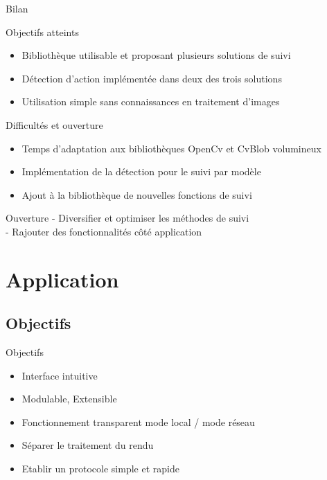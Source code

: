\documentclass{beamer}
\begin{document}
            \begin{frame}{Bilan}
                  \begin{exampleblock}{Objectifs atteints}
                        \begin{itemize}
                        \item Bibliothèque utilisable et proposant plusieurs solutions de suivi
                        \item Détection d'action implémentée dans deux des trois solutions
                        \item Utilisation simple sans connaissances en traitement d'images
                        \end{itemize}
                  \end{exampleblock}
                  \pause
                  \begin{alertblock}{Difficultés et ouverture}
                        \begin{itemize}
                        \item Temps d'adaptation aux bibliothèques OpenCv et CvBlob volumineux
                        \item Implémentation de la détection pour le suivi par modèle
                        \item Ajout à la bibliothèque de nouvelles fonctions de suivi
                        \end{itemize}
                  \end{alertblock}
				  
                  \begin{block}{Ouverture}
                        - Diversifier et optimiser les méthodes de suivi \\
                        - Rajouter des fonctionnalités côté application \\
                  \end{block}				  
            \end{frame}
      
	\section{Application}
	
		\subsection{Objectifs}
		\begin{frame}{Objectifs}
			\begin{itemize}
				\item Interface intuitive
				\item Modulable, Extensible
				\item Fonctionnement transparent mode local / mode réseau
				\item Séparer le traitement du rendu
				\item Etablir un protocole simple et rapide
			\end{itemize}
		\end{frame}
	
\end{document}
